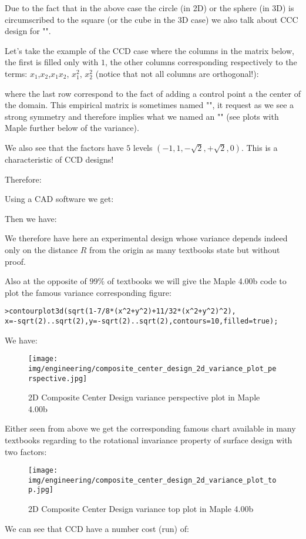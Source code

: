  	Due to the fact that in the above case the circle (in 2D) or the sphere (in 3D) is circumscribed to the square (or the cube in the 3D case) we also talk about CCC design for "".

	Let's take the example of the CCD case where the columns in the matrix below, the first is filled only with $1$, the other columns corresponding respectively to the terms: $x_1$,$x_2$,$x_1x_2$, $x_1^2$, $x_2^2$ (notice that not all columns are orthogonal!):
	
	where the last row correspond to the fact of adding a control point a the center of the domain. This empirical matrix is sometimes named "", it request as we see a strong symmetry and therefore implies what we named an "" (see plots with Maple further below of the variance).
	
	We also see that the factors have $5$ levels $(-1,1,-\sqrt{2},+\sqrt{2},0)$. This is a characteristic of CCD designs!
	
	Therefore:
	
	Using a CAD software we get:
	
	Then we have:
	
	We therefore have here an experimental design whose variance depends indeed only on the distance $R$ from the origin as many textbooks state but without proof.

	Also at the opposite of $99\%$ of textbooks we will give the Maple 4.00b code to plot the famous variance corresponding figure:

	\texttt{>contourplot3d(sqrt(1-7/8*(x\string^2+y\string^2)+11/32*(x\string^2+y\string^2)\string^2),\\x=-sqrt(2)..sqrt(2),y=-sqrt(2)..sqrt(2),contours=10,filled=true);}
	
	We have:
	\begin{figure}[H]
		\centering
		\texttt{[image: img/engineering/composite\_center\_design\_2d\_variance\_plot\_perspective.jpg]}	
		\caption{2D Composite Center Design variance perspective plot in Maple 4.00b}
	\end{figure}
	Either seen from above we get the corresponding famous chart available in many textbooks regarding to the rotational invariance property of surface design with two factors:
	\begin{figure}[H]
		\centering
		\texttt{[image: img/engineering/composite\_center\_design\_2d\_variance\_plot\_top.jpg]}	
		\caption{2D Composite Center Design variance top plot in Maple 4.00b}
	\end{figure}
	We can see that CCD have a number cost (run) of:
	
